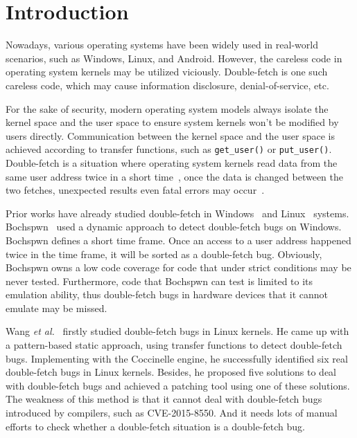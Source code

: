 \documentclass[10pt]{llncs}
\begin{document}


\section{Introduction}%
\label{intro}
Nowadays, various operating systems have been widely used in real-world scenarios, such as Windows, Linux, and Android. However, the careless code in operating system kernels may be utilized viciously. Double-fetch is one such careless code, which may cause information disclosure, denial-of-service, etc.~\cite{dfcompat,Wang2017A,hammou2016exploiting}

For the sake of security, modern operating system models always isolate the kernel space and the user space to ensure system kernels won't be modified by users directly. Communication between the kernel space and the user space is achieved according to transfer functions, such as \verb:get_user(): or \verb:put_user():. Double-fetch is a situation where operating system kernels read data from the same user address twice in a short time~\cite{wang,Wang2017A}, once the data is changed between the two fetches, unexpected results even fatal errors may occur~\cite{dfcompat}.

Prior works have already studied double-fetch in Windows~\cite{hammou2016exploiting,jurczyk2013identifying,bochspwn} and Linux~\cite{wang,Wang2017A,precise,modern} systems. Bochspwn~\cite{bochspwn,hammou2016exploiting} used a dynamic approach to detect double-fetch bugs on Windows. Bochspwn defines a short time frame. Once an access to a user address happened twice in the time frame, it will be sorted as a double-fetch bug. Obviously, Bochspwn owns a low code coverage for code that under strict conditions may be never tested. Furthermore, code that Bochspwn can test is limited to its emulation ability, thus double-fetch bugs in hardware devices that it cannot emulate may be missed.

Wang \textit{et al.}~\cite{Wang2017A,wang} firstly studied double-fetch bugs in Linux kernels. He came up with a pattern-based static approach, using transfer functions to detect double-fetch bugs.
Implementing with the Coccinelle engine, he successfully identified six real double-fetch bugs in Linux kernels. Besides, he proposed five solutions to deal with double-fetch bugs and achieved a patching tool using one of these solutions. The weakness of this method is that it cannot deal with double-fetch bugs introduced by compilers, such as CVE-2015-8550. And it needs lots of manual efforts to check whether a double-fetch situation is a double-fetch bug.
\end{document}

